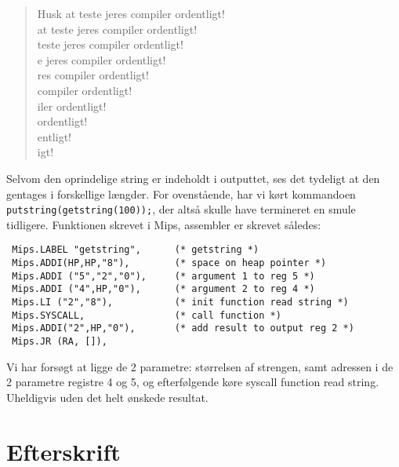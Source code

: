 \documentclass[12pt]{article}
\begin{document}
\begin{quote}
Husk at teste jeres compiler ordentligt! \\
 at teste jeres compiler ordentligt! \\
teste jeres compiler ordentligt! \\
e jeres compiler ordentligt! \\
res compiler ordentligt! \\
compiler ordentligt! \\
iler ordentligt! \\
 ordentligt! \\
entligt!\\
igt!
\end{quote}

Selvom den oprindelige string er indeholdt i outputtet, ses det tydeligt at den
gentages i forskellige længder. For ovenstående, har vi kørt kommandoen
\texttt{putstring(getstring(100));}, der altså skulle have termineret en smule
tidligere. Funktionen skrevet i Mips, assembler er skrevet således:

\begin{verbatim}
 Mips.LABEL "getstring",      (* getstring *)
 Mips.ADDI(HP,HP,"8"),        (* space on heap pointer *)
 Mips.ADDI ("5","2","0"),     (* argument 1 to reg 5 *)  
 Mips.ADDI ("4",HP,"0"),      (* argument 2 to reg 4 *)    
 Mips.LI ("2","8"),           (* init function read string *)
 Mips.SYSCALL,                (* call function *)
 Mips.ADDI("2",HP,"0"),       (* add result to output reg 2 *)    
 Mips.JR (RA, []),
\end{verbatim}

Vi har forsøgt at ligge de 2 parametre: størrelsen af strengen, samt adressen i
de 2 parametre registre 4 og 5, og efterfølgende køre syscall function
read string. Uheldigvis uden det helt ønskede resultat.

\section{Efterskrift}

{}

\end{document}
